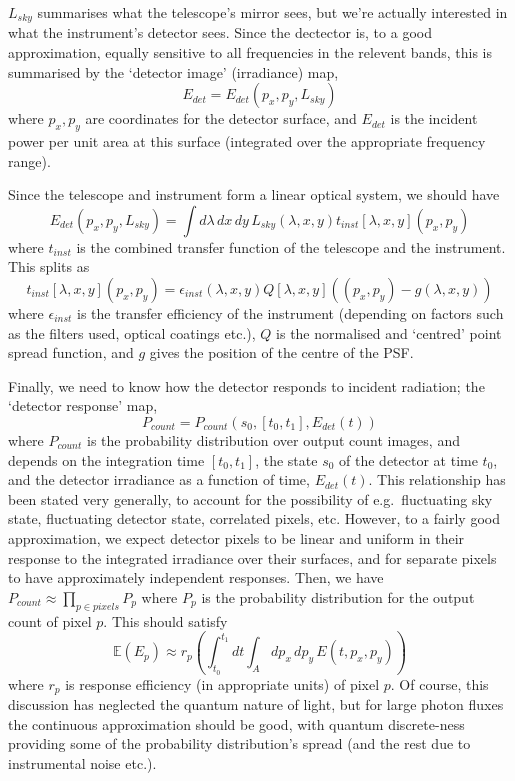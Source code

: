 $L_{sky}$ summarises what the telescope's mirror sees, but we're
actually interested in what the instrument's detector sees. Since
the dectector is, to a good approximation, equally sensitive to all
frequencies in the relevent bands, this is summarised by the `detector
image' (irradiance) map,
\[
E_{det} = E_{det} (p_x, p_y, L_{sky})
\]
where $p_x, p_y$ are coordinates for the detector surface, and
$E_{det}$ is the incident power per unit area at this surface
(integrated over the appropriate frequency range).

Since the telescope and instrument form a linear optical system,
we should have
\[
E_{det}(p_x, p_y, L_{sky}) = \int d\lambda\, dx\, dy\, L_{sky}(\lambda, x, y) t_{inst}[\lambda, x, y](p_x, p_y)
\]
where $t_{inst}$ is the combined transfer function of the telescope and the instrument.
This splits as 
\[
t_{inst}[\lambda,x, y](p_x, p_y) = \epsilon_{inst} (\lambda, x, y)
Q[\lambda, x, y]((p_x, p_y) - g (\lambda, x, y))
\]
where $\epsilon_{inst}$ is the transfer efficiency of the instrument
(depending on factors such as the filters used, optical coatings etc.),
$Q$ is the normalised and `centred' point spread function, and $g$ gives
the position of the centre of the PSF.

Finally, we need to know how the detector responds to incident radiation;
the `detector response' map,
\[
P_{count} = P_{count} (s_0, [t_0, t_1], E_{det}(t))
\]
where $P_{count}$ is the probability distribution over output count images,
and depends on the integration time $[t_0, t_1]$, the state $s_0$ of the detector
at time $t_0$, and the detector irradiance as a function of time, $E_{det}(t)$.
This relationship has been stated very generally, to account for the possibility
of e.g.\ fluctuating sky state, fluctuating detector state, correlated pixels, etc.
However, to a fairly good approximation, we expect detector pixels to be linear
and uniform in their response to the integrated irradiance over their surfaces,
and for separate pixels to have approximately independent responses. Then,
we have
$P_{count} \approx \prod_{p \in pixels} P_p$
where $P_p$ is the probability distribution for the output count of pixel $p$.
This should satisfy
\[
\mathbb{E}(E_p) \approx r_p \left (\int_{t_0}^{t_1} dt \int_A dp_x\, dp_y\, E(t, p_x, p_y)\right)
\]
where $r_p$ is response efficiency (in appropriate units) of pixel $p$. Of course,
this discussion has neglected the quantum nature of light, but for large photon
fluxes the continuous approximation should be good, with quantum discrete-ness
providing some of the probability distribution's spread (and the rest due to instrumental
noise etc.).

